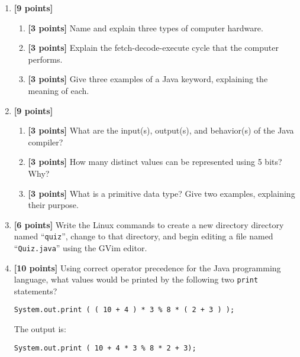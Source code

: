 \begin{enumerate}
\item {\bf [9 points]}
\begin{enumerate}
\item {\bf [3 points]} 
Name and explain three types of computer hardware.
\bigskip
\bigskip
\bigskip
\bigskip
\item {\bf [3 points]} 
Explain the fetch-decode-execute cycle that the computer performs.

\bigskip
\bigskip
\bigskip
\bigskip
\item {\bf [3 points]} 
Give three examples of a Java keyword, explaining the meaning of each.
\bigskip
\bigskip
\bigskip
\bigskip
\end{enumerate}
\item {\bf [9 points]}
\begin{enumerate}
\item {\bf [3 points]} 
  What are the input(s), output(s), and behavior(s) of the Java compiler?
\bigskip
\bigskip
\bigskip
\bigskip
\item {\bf [3 points]} 
How many distinct values can be represented using 5 bits? Why?
\bigskip
\bigskip
\bigskip
\bigskip
\item {\bf [3 points]} 
What is a primitive data type? Give two examples, explaining their purpose.
\end{enumerate}
\bigskip
\bigskip
\bigskip
\bigskip

\item {\bf [6 points]}
Write the Linux commands to create a new directory directory named ``{\tt quiz}'',
change to that directory, and begin editing a file named ``{\tt Quiz.java}'' using
the GVim editor.

\vspace{2in}

\item {\bf[10 points]} Using correct operator precedence for the Java programming language, what values would be printed
  by the following two {\tt print} statements?

\begin{verbatim}
System.out.print ( ( 10 + 4 ) * 3 % 8 * ( 2 + 3 ) ); 		
\end{verbatim}

\vspace*{-.175in}
The output is: \mbox{\underline{\hspace{3in}}}

\begin{verbatim}
System.out.print ( 10 + 4 * 3 % 8 * 2 + 3);				    
\end{verbatim}	


\end{enumerate}

